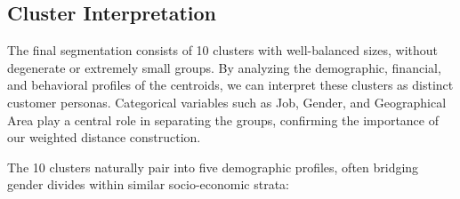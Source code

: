 \documentclass[9pt,a4paper,twocolumn,twoside]{rho-class/rho}
\begin{document}
\subsection{Cluster Interpretation}

The final segmentation consists of 10 clusters with well-balanced sizes, without degenerate or extremely small groups. By analyzing the demographic, financial, and behavioral profiles of the centroids, we can interpret these clusters as distinct customer personas. Categorical variables such as Job, Gender, and Geographical Area play a central role in separating the groups, confirming the importance of our weighted distance construction.

The 10 clusters naturally pair into five demographic profiles, often bridging gender divides within similar socio-economic strata:
\end{document}
